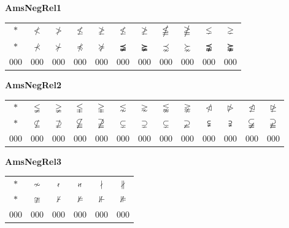 \documentclass[12pt]{report}
\newlength{\mine}
\newlength{\niz}
\def\pmb{}
\begin{document}
\newpage

\textbf{AmsNegRel1}
\par\nobreak\vspace{2mm}
\begin{tabular}{|c|cccccccccc|}
  \hline
   $\pmb *$&
   $\pmb\nless $&
   $\pmb\ngtr $&
   $\pmb\nleq $&
   $\pmb\ngeq $&
   $\pmb\nleqslant $&
   $\pmb\ngeqslant $&
   $\pmb\nleqq $&
   $\pmb\ngeqq $&
   $\pmb\lneq $&
   $\pmb\gneq $\\[\mine]
   $\pmb *$&
   $\pmb\nprec $&
   $\pmb\nsucc $&
   $\pmb\npreceq $&
   $\pmb\nsucceq $&
   $\pmb\precneqq $&
   $\pmb\succneqq $&
   $\pmb\precnsim $&
   $\pmb\succnsim $&
   $\pmb\precnapprox $&
   $\pmb\succnapprox $\\[\niz]
  \hline\hline
  000&000&000&000&000&000&000&000&000&000&000\\
  \hline
\end{tabular}
\goodbreak\par\vspace{3mm}

\textbf{AmsNegRel2}
\par\nobreak\vspace{2mm}
\begin{tabular}{|c|cccccccccccc|}
  \hline
   $\pmb *$&
   $\pmb\lneqq $&
   $\pmb\gneqq $&
   $\pmb\lvertneqq $&
   $\pmb\gvertneqq $&
   $\pmb\lnsim $&
   $\pmb\gnsim $&
   $\pmb\lnapprox $&
   $\pmb\gnapprox $&
   $\pmb\ntriangleleft $&
   $\pmb\ntriangleright $&
   $\pmb\ntrianglelefteq $&
   $\pmb\ntrianglerighteq $\\[\mine]
   $\pmb *$&
   $\pmb\nsubseteq $&
   $\pmb\nsupseteq $&
   $\pmb\nsubseteqq $&
   $\pmb\nsupseteqq $&
   $\pmb\subsetneq $&
   $\pmb\supsetneq $&
   $\pmb\varsubsetneq $&
   $\pmb\varsupsetneq $&
   $\pmb\subsetneqq $&
   $\pmb\supsetneqq $&
   $\pmb\varsubsetneqq $&
   $\pmb\varsupsetneqq $\\[\niz]
  \hline\hline
  000&000&000&000&000&000&000&000&000&000&000&000&000\\
  \hline
\end{tabular}
\goodbreak\par\vspace{3mm}

\textbf{AmsNegRel3}
\par\nobreak\vspace{2mm}
\begin{tabular}{|c|ccccc|}
  \hline
   $\pmb *$&
   $\pmb\nsim $&
   $\pmb\nshortmid $&
   $\pmb\nshortparallel $&
   $\pmb\nmid $&
   $\pmb\nparallel $\\[\mine]
   $\pmb *$&
   $\pmb\ncong $&
   $\pmb\nvdash $&
   $\pmb\nvDash $&
   $\pmb\nVdash $&
   $\pmb\nVDash $\\[\niz]
  \hline\hline
  000&000&000&000&000&000\\
  \hline
\end{tabular}
\goodbreak\par\vspace{3mm}
\end{document}
